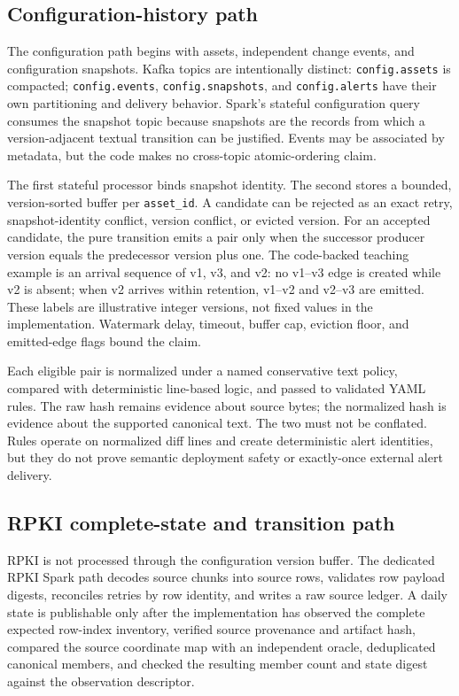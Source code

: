 \documentclass[a4paper,11pt]{article}
\begin{document}
\subsection{Configuration-history path}

The configuration path begins with assets, independent change events, and configuration snapshots. Kafka topics are intentionally distinct: \texttt{config.assets} is compacted; \texttt{config.events}, \texttt{config.snapshots}, and \texttt{config.alerts} have their own partitioning and delivery behavior. Spark's stateful configuration query consumes the snapshot topic because snapshots are the records from which a version-adjacent textual transition can be justified. Events may be associated by metadata, but the code makes no cross-topic atomic-ordering claim.

The first stateful processor binds snapshot identity. The second stores a bounded, version-sorted buffer per \texttt{asset\_id}. A candidate can be rejected as an exact retry, snapshot-identity conflict, version conflict, or evicted version. For an accepted candidate, the pure transition emits a pair only when the successor producer version equals the predecessor version plus one. The code-backed teaching example is an arrival sequence of v1, v3, and v2: no v1--v3 edge is created while v2 is absent; when v2 arrives within retention, v1--v2 and v2--v3 are emitted. These labels are illustrative integer versions, not fixed values in the implementation. Watermark delay, timeout, buffer cap, eviction floor, and emitted-edge flags bound the claim.

Each eligible pair is normalized under a named conservative text policy, compared with deterministic line-based logic, and passed to validated YAML rules. The raw hash remains evidence about source bytes; the normalized hash is evidence about the supported canonical text. The two must not be conflated. Rules operate on normalized diff lines and create deterministic alert identities, but they do not prove semantic deployment safety or exactly-once external alert delivery.

\subsection{RPKI complete-state and transition path}

RPKI is not processed through the configuration version buffer. The dedicated RPKI Spark path decodes source chunks into source rows, validates row payload digests, reconciles retries by row identity, and writes a raw source ledger. A daily state is publishable only after the implementation has observed the complete expected row-index inventory, verified source provenance and artifact hash, compared the source coordinate map with an independent oracle, deduplicated canonical members, and checked the resulting member count and state digest against the observation descriptor.
\end{document}
